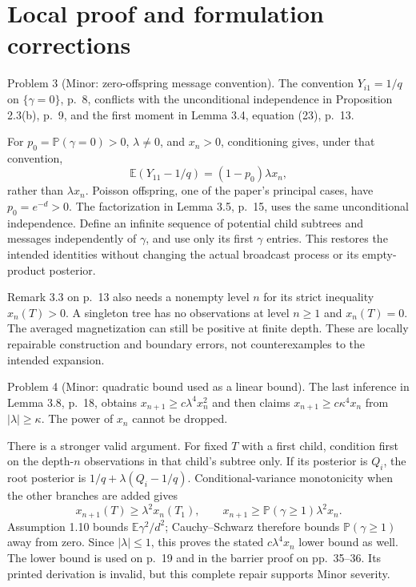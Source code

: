 \documentclass[10pt]{article}
\begin{document}
\section*{Local proof and formulation corrections}
Problem 3 (Minor: zero-offspring message convention).  The convention \(Y_{i1}=1/q\) on \(\{\gamma=0\}\), p. 8, conflicts with the unconditional independence in Proposition 2.3(b), p. 9, and the first moment in Lemma 3.4, equation (23), p. 13.\par
For \(p_0=\mathbb P(\gamma=0)>0\), \(\lambda\ne0\), and \(x_n>0\), conditioning gives, under that convention, \[\mathbb E(Y_{11}-1/q)=(1-p_0)\lambda x_n,\] rather than \(\lambda x_n\). Poisson offspring, one of the paper’s principal cases, have \(p_0=e^{-d}>0\). The factorization in Lemma 3.5, p. 15, uses the same unconditional independence. Define an infinite sequence of potential child subtrees and messages independently of \(\gamma\), and use only its first \(\gamma\) entries. This restores the intended identities without changing the actual broadcast process or its empty-product posterior.\par
Remark 3.3 on p. 13 also needs a nonempty level \(n\) for its strict inequality \(x_n(T)>0\). A singleton tree has no observations at level \(n\geq1\) and \(x_n(T)=0\). The averaged magnetization can still be positive at finite depth. These are locally repairable construction and boundary errors, not counterexamples to the intended expansion.\par
Problem 4 (Minor: quadratic bound used as a linear bound).  The last inference in Lemma 3.8, p. 18, obtains \(x_{n+1}\geq c\lambda^4x_n^2\) and then claims \(x_{n+1}\geq c\kappa^4x_n\) from \(|\lambda|\geq\kappa\). The power of \(x_n\) cannot be dropped.\par
There is a stronger valid argument. For fixed \(T\) with a first child, condition first on the depth-\(n\) observations in that child’s subtree only. If its posterior is \(Q_i\), the root posterior is \(1/q+\lambda(Q_i-1/q)\). Conditional-variance monotonicity when the other branches are added gives \[x_{n+1}(T)\geq\lambda^2x_n(T_1),\qquad
 x_{n+1}\geq\mathbb P(\gamma\geq1)\lambda^2x_n.\] Assumption 1.10 bounds \(\mathbb E\gamma^2/d^2\); Cauchy–Schwarz therefore bounds \(\mathbb P(\gamma\geq1)\) away from zero. Since \(|\lambda|\leq1\), this proves the stated \(c\lambda^4x_n\) lower bound as well. The lower bound is used on p. 19 and in the barrier proof on pp. 35–36. Its printed derivation is invalid, but this complete repair supports Minor severity.\par
\end{document}
